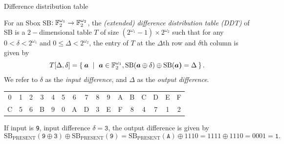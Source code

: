 \begin{frame}{Difference distribution table}
    \begin{definition}
    For an Sbox SB$:{\mathbb F}_2^{\omega_1}\to{\mathbb F}_2^{\omega_2}$, the \textit{(extended) difference distribution table (DDT)} of SB is a $2-$dimensional table $T$ of size $(2^{\omega_1}-1)\times2^{\omega_2}$ such that for any $0<\delta<2^{\omega_1}$ and $0\leq\Delta<2^{\omega_2}$, the entry of $T$ at the $\Delta$th row and $\delta$th column is given by
    \[
    T[\Delta,\delta]=\Set{\boldsymbol{a}\ |\ \boldsymbol{a}\in\FF_2^{\omega_1}, \text{SB}(\boldsymbol{a}\oplus \delta)\oplus \text{SB}(\boldsymbol{a)}=\Delta}.
    \]
    We refer to $\delta$ as the \textit{input difference}, and $\Delta$ as the \textit{output difference}.
\end{definition}
\begin{example}
\begin{table}
\begin{tabular}{cccccccccccccccc}\hline
0 & 1 & 2 & 3 & 4 & 5 & 6 & 7 & 8 & 9 & A & B & C & D & E & F \\
C & 5 & 6 & B & 9 & 0 & A & D & 3 & E & F & 8 & 4 & 7 & 1 & 2\\\hline
\end{tabular}
\end{table}
If input is \texttt{9}, input difference $\delta=\texttt{3}$, the output difference is given by
\[
\text{SB}_{\text{PRESENT}}(\texttt{9}\oplus \texttt{3})\oplus \text{SB}_{\text{PRESENT}}(\texttt{9})=\text{SB}_{\text{PRESENT}}(\texttt{A})\oplus1110=1111\oplus1110=0001=\texttt{1}.
\]
\end{example}
\end{frame}

